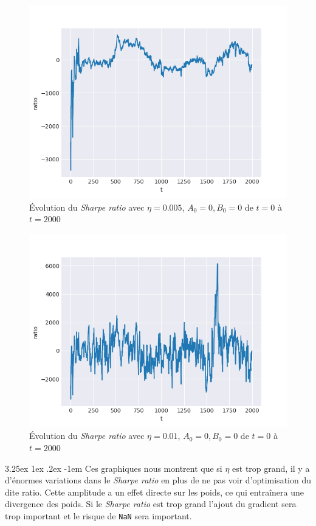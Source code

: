 \documentclass[a4paper, 11pt]{article}
\makeatletter
\renewcommand\paragraph{\@startsection{paragraph}{5}{\z@}%
  {3.25ex \@plus1ex \@minus.2ex}%
  {-1em}%
  {\normalfont\normalsize\bfseries}}
\makeatother
\begin{document}
  \begin{figure}[H]
\centering
\includegraphics[]{images/res/exemple_eta_0005}
\caption[Blup]{Évolution du \textit{Sharpe ratio} avec $\eta = 0.005$, $A_0 = 0, B_0 = 0$ de $t=0$ à $t=2000$}
\end{figure}

  \begin{figure}[H]
\centering
\includegraphics[]{images/res/exemple_eta_too_big}
\caption[Blup]{Évolution du \textit{Sharpe ratio} avec $\eta = 0.01$, $A_0 = 0, B_0 = 0$ de $t=0$ à $t=2000$}
\end{figure}
 
 \paragraph{}
 Ces graphiques nous montrent que si $\eta$ est trop grand, il y a d'énormes variations dans le \textit{Sharpe ratio} en plus de ne pas voir d'optimisation
 du dite ratio. Cette amplitude a un effet directe sur les poids, ce qui entraînera une divergence des poids. Si le \textit{Sharpe ratio} est trop grand
 l'ajout du gradient sera trop important et le risque de \texttt{NaN} sera important.
 
\end{document}
